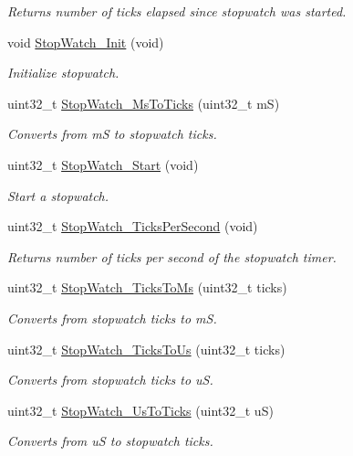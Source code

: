 \begin{DoxyCompactItemize}
\begin{DoxyCompactList}\small\item\em Returns number of ticks elapsed since stopwatch was started. \end{DoxyCompactList}\item 
void \hyperlink{group__Stop__Watch_gaa0f8ea277b700d20b4322a15d9ddf32c}{Stop\+Watch\+\_\+\+Init} (void)
\begin{DoxyCompactList}\small\item\em Initialize stopwatch. \end{DoxyCompactList}\item 
uint32\+\_\+t \hyperlink{group__Stop__Watch_ga00f0c8411acd07344c7dd3cac8ec6d3e}{Stop\+Watch\+\_\+\+Ms\+To\+Ticks} (uint32\+\_\+t mS)
\begin{DoxyCompactList}\small\item\em Converts from mS to stopwatch ticks. \end{DoxyCompactList}\item 
uint32\+\_\+t \hyperlink{group__Stop__Watch_ga0dbab611d6cbdd4faad5018131aca140}{Stop\+Watch\+\_\+\+Start} (void)
\begin{DoxyCompactList}\small\item\em Start a stopwatch. \end{DoxyCompactList}\item 
uint32\+\_\+t \hyperlink{group__Stop__Watch_gae780d65d75ed3ca6dbd33389479eed9f}{Stop\+Watch\+\_\+\+Ticks\+Per\+Second} (void)
\begin{DoxyCompactList}\small\item\em Returns number of ticks per second of the stopwatch timer. \end{DoxyCompactList}\item 
uint32\+\_\+t \hyperlink{group__Stop__Watch_gab62ee68f7b01b5c14b0d19c3c391ca02}{Stop\+Watch\+\_\+\+Ticks\+To\+Ms} (uint32\+\_\+t ticks)
\begin{DoxyCompactList}\small\item\em Converts from stopwatch ticks to mS. \end{DoxyCompactList}\item 
uint32\+\_\+t \hyperlink{group__Stop__Watch_ga76fc3c7b473615677932efe3e5d0e142}{Stop\+Watch\+\_\+\+Ticks\+To\+Us} (uint32\+\_\+t ticks)
\begin{DoxyCompactList}\small\item\em Converts from stopwatch ticks to uS. \end{DoxyCompactList}\item 
uint32\+\_\+t \hyperlink{group__Stop__Watch_ga65ab3801fdb76aab8879a0698fc4df45}{Stop\+Watch\+\_\+\+Us\+To\+Ticks} (uint32\+\_\+t uS)
\begin{DoxyCompactList}\small\item\em Converts from uS to stopwatch ticks. \end{DoxyCompactList}\end{DoxyCompactItemize}


